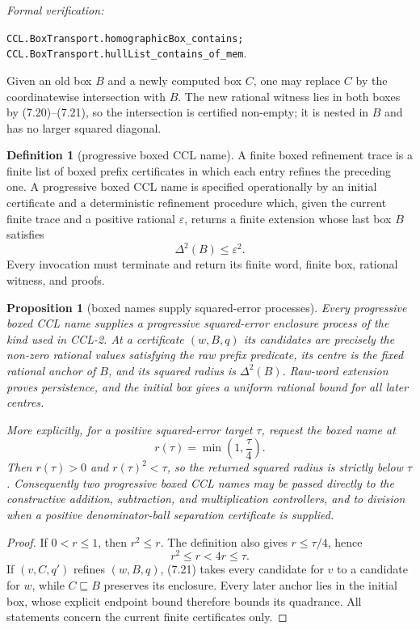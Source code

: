 \documentclass[10pt]{article}
\newtheorem{proposition}[theorem]{Proposition}
\theoremstyle{definition}
\newtheorem{definition}[theorem]{Definition}
\theoremstyle{remark}
\newcommand{\leanref}[1]{\par\smallskip\noindent
  \emph{Formal verification:}\par\nobreak
  {\raggedright\nolinkurl{#1}.\par}}
\begin{document}
\leanref{CCL.BoxTransport.homographicBox_contains;
CCL.BoxTransport.hullList_contains_of_mem}

Given an old box $B$ and a newly computed box $C$, one may replace $C$ by the coordinatewise intersection with $B$.  The new rational witness lies in both boxes by (7.20)--(7.21), so the intersection is certified non-empty; it is nested in $B$ and has no larger squared diagonal.

\begin{definition}[progressive boxed CCL name]
A finite boxed refinement trace is a finite list of boxed prefix certificates in which each entry refines the preceding one.  A progressive boxed CCL name is specified operationally by an initial certificate and a deterministic refinement procedure which, given the current finite trace and a positive rational $\varepsilon$, returns a finite extension whose last box $B$ satisfies
\[
 \Delta^2(B)\le\varepsilon^2.
\tag{7.26}
\]
Every invocation must terminate and return its finite word, finite box, rational witness, and proofs.
\end{definition}

\begin{proposition}[boxed names supply squared-error processes]\label{prop:boxed-name-process}
Every progressive boxed CCL name supplies a progressive squared-error
enclosure process of the kind used in CCL-2.  At a certificate $(w,B,q)$
its candidates are precisely the non-zero rational values satisfying the raw
prefix predicate, its centre is the fixed rational anchor of $B$, and its
squared radius is $\Delta^2(B)$.  Raw-word extension proves persistence, and
the initial box gives a uniform rational bound for all later centres.

More explicitly, for a positive squared-error target $\tau$, request the
boxed name at
\[
 r(\tau)=\min\!\left(1,\frac{\tau}{4}\right).
\]
Then $r(\tau)>0$ and $r(\tau)^2<\tau$, so the returned squared radius is
strictly below $\tau$.  Consequently two progressive boxed CCL names may be
passed directly to the constructive addition, subtraction, and multiplication
controllers, and to division when a positive denominator-ball separation
certificate is supplied.
\end{proposition}

\begin{proof}
If $0<r\le1$, then $r^2\le r$.  The definition also gives
$r\le\tau/4$, hence
\[
 r^2\le r<4r\le\tau.
\]
If $(v,C,q')$ refines $(w,B,q)$, (7.21) takes every candidate for $v$
to a candidate for $w$, while $C\sqsubseteq B$ preserves its enclosure.
Every later anchor lies in the initial box, whose explicit endpoint bound
therefore bounds its quadrance.  All statements concern the current finite
certificates only.
\end{proof}
\end{document}

